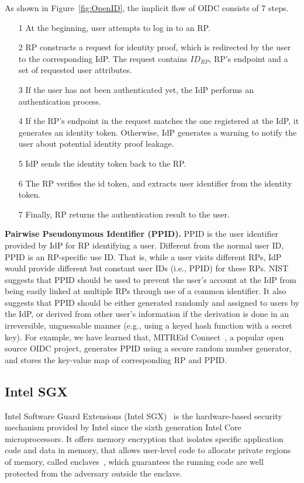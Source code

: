 As shown in Figure~\ref{fig:OpenID}, the implicit flow of OIDC consists of 7 steps.
\begin{itemize}
\item[1] At the beginning, user attempts to log in to an RP.
\item[2] RP constructs a request for identity proof, which is redirected by the user to the corresponding IdP. The request contains $ID_{RP}$, RP's endpoint and a set of requested user attributes.
\item[3] If the user has not been authenticated yet, the IdP performs an authentication process.
\item[4] If the RP's endpoint in the request matches the one registered at the IdP, it generates an identity token. Otherwise, IdP generates a warning to notify the user about potential identity proof leakage.
\item[5] IdP sends the identity token back to the RP.
\item[6] The RP verifies the id token, and extracts user identifier from the identity token.
\item[7] Finally, RP returns the authentication result to the user.
\end{itemize}

\vspace{3mm}\noindent\textbf{Pairwise Pseudonymous Identifier (PPID).} 
PPID is the user identifier provided by IdP for RP identifying a user. Different from the normal user ID, PPID is an RP-specific use ID. That is, while a user visits different RPs, IdP would provide different but constant user IDs (i.e., PPID) for these RPs.    
NIST~\cite{NIST2017draft} suggests that PPID should be used to prevent the user's account at the IdP from being easily linked at multiple RPs through use of a common identifier. 
It also suggests that PPID should be either generated randomly and assigned to users by the IdP, or derived from other user's information if the derivation is done in an irreversible, unguessable manner (e.g., using a keyed hash function with a secret key). For example, we have learned that, MITREid Connect~\cite{MITREid}, a popular open source OIDC project, generates PPID using a secure random number generator, and stores the key-value map of corresponding RP and PPID.


\subsection{Intel SGX}
Intel Software Guard Extensions (Intel SGX)~\cite{costan2016intel} is the hardware-based security  mechanism provided by Intel since the sixth generation Intel Core microprocessors. It offers memory encryption that isolates specific application code and data in memory, that allows user-level code to allocate private regions of memory, called enclaves~\cite{costan2016intel}, which guarantees the running code are well protected from the adversary outside the enclave.
 
